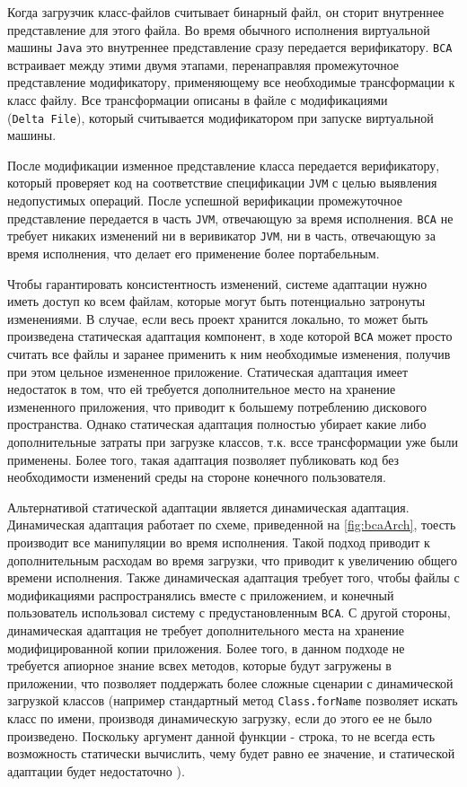 Когда загрузчик класс-файлов считывает бинарный файл, он сторит внутреннее представление для этого файла. Во время обычного исполнения виртуальной машины \texttt{Java} это внутреннее представление сразу передается верификатору. \texttt{BCA} встраивает между этими двумя этапами, перенаправляя промежуточное представление модификатору, применяющему все необходимые трансформации к класс файлу. Все трансформации описаны в файле с модификациями (\texttt{Delta~File}), который считывается модификатором при запуске виртуальной машины. 

После модификации изменное представление класса передается верификатору, который проверяет код на соответствие спецификации \texttt{JVM} с целью выявления недопустимых операций. После успешной верификации промежуточное представление передается в часть \texttt{JVM}, отвечающую за время исполнения. \texttt{BCA} не требует никаких изменений ни в веривикатор \texttt{JVM}, ни в часть, отвечающую за время исполнения, что делает его применение более портабельным.

Чтобы гарантировать консистентность изменений, системе адаптации нужно иметь доступ ко всем файлам, которые могут быть потенциально затронуты изменениями. В случае, если весь проект хранится локально, то может быть произведена статическая адаптация компонент, в ходе которой \texttt{BCA} может просто считать все файлы и заранее применить к ним необходимые изменения, получив при этом цельное измененное приложение. Статическая адаптация имеет недостаток в том, что ей требуется дополнительное место на хранение измененного приложения, что приводит к большему потреблению дискового пространства. Однако статическая адаптация полностью убирает какие либо дополнительные затраты при загрузке классов, т.к. вссе трансформации уже были применены. Более того, такая адаптация позволяет публиковать код без необходимости изменений среды на стороне конечного пользователя.

Альтернативой статической адаптации является динамическая адаптация. Динамическая адаптация работает по схеме, приведенной на \autoref{fig:bcaArch}, тоесть производит все манипуляции во время исполнения. Такой подход приводит к дополнительным расходам во время загрузки, что приводит к увеличению общего времени исполнения. Также динамическая адаптация требует того, чтобы файлы с модификациями распространялись вместе с приложением, и конечный пользователь использовал систему с предустановленным \texttt{BCA}. С другой стороны, динамическая адаптация не требует дополнительного места на хранение модифицированной копии приложения. Более того, в данном подходе не требуется апиорное знание всвех методов, которые будут загружены в приложении, что позволяет поддержать более сложные сценарии с динамической загрузкой классов (например стандартный метод \texttt{Class.forName} позволяет искать класс по имени, производя динамическую загрузку, если до этого ее не было произведено. Поскольку аргумент данной функции - строка, то не всегда есть возможность статически вычислить, чему будет равно ее значение, и статической адаптации будет недостаточно \cite{bca}).

